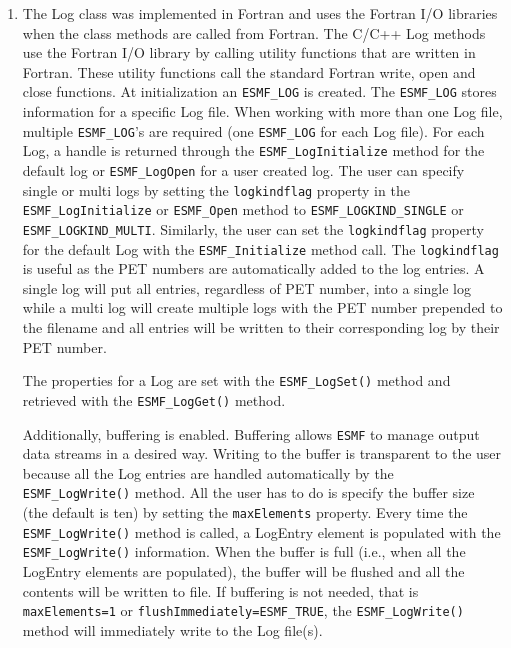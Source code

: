 %
\begin{enumerate}

\item The Log class was implemented in Fortran and uses the Fortran I/O 
libraries when the class methods are called from Fortran. The C/C++ Log
methods use the Fortran I/O library by calling utility functions that are
written in Fortran. These utility functions call the standard Fortran write, 
open and close functions.  At initialization an {\tt ESMF\_LOG} is created. 
The {\tt ESMF\_LOG} stores information for a specific Log file.   When working 
with more than one Log file, multiple {\tt ESMF\_LOG}'s are required (one 
{\tt ESMF\_LOG} for each Log file).  For each Log, a handle is returned 
through the {\tt ESMF\_LogInitialize} method for the default log or {\tt ESMF\_LogOpen} for a user created log.  The user can specify single or multi logs by 
setting the {\tt logkindflag} property in the {\tt ESMF\_LogInitialize} or 
{\tt ESMF\_Open} method to {\tt ESMF\_LOGKIND\_SINGLE} or {\tt ESMF\_LOGKIND\_MULTI}.
Similarly, the user can set the {\tt logkindflag} property for the default
Log with the {\tt ESMF\_Initialize} method call.
The {\tt logkindflag} is useful as the PET numbers are automatically added to the 
log entries.  A single log will put all entries, regardless of PET number, 
into a single log while a multi log will create multiple logs with the PET 
number prepended to the filename and all entries will be written to their 
corresponding log by their PET number.

The properties for a Log are set with the {\tt ESMF\_LogSet()} method and 
retrieved with the {\tt ESMF\_LogGet()} method.

Additionally, buffering is enabled.  Buffering allows {\tt ESMF} to manage 
output data streams in a desired way.  Writing to the buffer is transparent 
to the user because all the Log entries are handled automatically by the 
{\tt ESMF\_LogWrite()} method.  All the user has to do is specify the buffer
size (the default is ten) by setting the {\tt maxElements} property.  Every 
time the {\tt ESMF\_LogWrite()} method is called, a LogEntry element is 
populated with the {\tt ESMF\_LogWrite()} information.  When the buffer is 
full (i.e., when all the LogEntry elements are populated), the buffer will be 
flushed and all the contents will be written to file.  If buffering is not 
needed, that is {\tt maxElements=1} or {\tt flushImmediately=ESMF\_TRUE}, 
the {\tt ESMF\_LogWrite()} method will immediately write to the Log file(s).
\end{enumerate}
